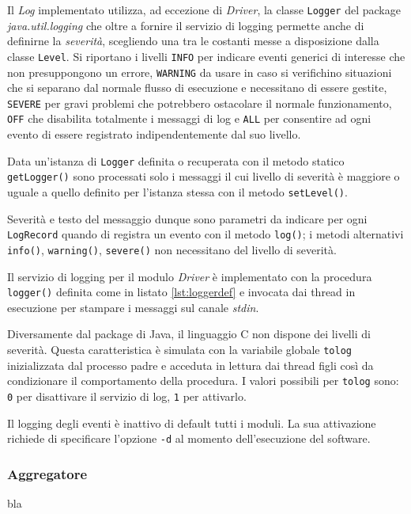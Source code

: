 Il \textit{Log} implementato utilizza, ad eccezione di \textit{Driver}, la
classe \texttt{Logger} del package \textit{java.util.logging} \cite{jianlog} che
oltre a fornire il servizio di logging permette anche di definirne la
\textit{severità}, scegliendo una tra le costanti messe a disposizione dalla
classe \texttt{Level}. Si riportano  i livelli \texttt{INFO}
per indicare eventi generici di interesse che non presuppongono un errore,
\texttt{WARNING} da usare in caso si verifichino situazioni che si separano dal
normale flusso di esecuzione e necessitano di essere gestite, \texttt{SEVERE}
per gravi problemi che potrebbero ostacolare il normale funzionamento,
\texttt{OFF} che disabilita totalmente i messaggi di log e \texttt{ALL} per
consentire ad ogni evento di essere registrato indipendentemente dal suo livello.

Data un'istanza di \texttt{Logger} definita o recuperata con il metodo statico
\texttt{getLogger()} sono processati solo i messaggi il cui livello di
severità è maggiore o uguale a quello definito per l'istanza stessa con il
metodo \texttt{setLevel()}.

Severità e testo del messaggio dunque sono parametri da indicare per ogni
\texttt{LogRecord} quando di registra un evento con il metodo \texttt{log()};
i metodi alternativi \texttt{info()}, \texttt{warning()}, \texttt{severe()} non
necessitano del livello di severità.

\vspace{5mm}

Il servizio di logging per il modulo \textit{Driver} è implementato con la
procedura \texttt{logger()} definita come in listato \ref{lst:loggerdef} e
invocata dai thread in esecuzione per stampare i messaggi sul canale
\textit{stdin}.

\vspace{5mm}



Diversamente dal package di Java, il linguaggio C non dispone dei livelli di
severità. Questa caratteristica è simulata con la variabile globale
\texttt{tolog} inizializzata dal processo padre e acceduta in lettura dai thread
figli così da condizionare il comportamento della procedura. I valori possibili
per \texttt{tolog} sono: \texttt{0} per disattivare il servizio di log,
\texttt{1} per attivarlo.

\vspace{5mm}
 
Il logging degli eventi è inattivo di default tutti i moduli. La sua attivazione
richiede di specificare l'opzione \texttt{-d} al momento dell'esecuzione del software.
\subsubsection{Aggregatore}
bla
\newpage